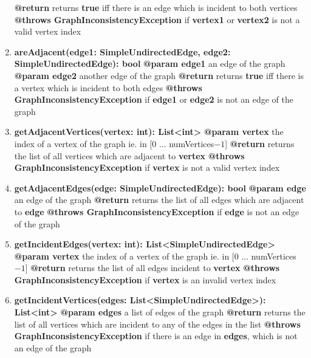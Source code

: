 \documentclass{article}
\begin{document}
\begin{enumerate}[+]
{			\textbf{@return} returns \textbf{true} iff there is an edge which is incident to both vertices \newline
			\textbf{@throws GraphInconsistencyException} if \textbf{vertex1} or \textbf{vertex2} is not a valid vertex index
		}
		\item{
			\textbf{areAdjacent(edge1: SimpleUndirectedEdge, edge2: SimpleUndirectedEdge): bool} \newline
			\textbf{@param edge1} an edge of the graph \newline
			\textbf{@param edge2} another edge of the graph \newline
			\textbf{@return} returns \textbf{true} iff there is a vertex which is incident to both edges \newline
			\textbf{@throws GraphInconsistencyException} if \textbf{edge1} or \textbf{edge2} is not an edge of the graph
		}
		\item{
			\textbf{getAdjacentVertices(vertex: int): List<int>} \newline
			\textbf{@param vertex} the index of a vertex of the graph ie. in [0 ... numVertices$-1$] \newline
			\textbf{@return} returns the list of all vertices which are adjacent to \textbf{vertex} \newline
			\textbf{@throws GraphInconsistencyException} if \textbf{vertex} is not a valid vertex index
		}
		\item{
			\textbf{getAdjacentEdges(edge: SimpleUndirectedEdge): bool} \newline
			\textbf{@param edge} an edge of the graph \newline
			\textbf{@return} returns the list of all edges which are adjacent to \textbf{edge} \newline
			\textbf{@throws GraphInconsistencyException} if \textbf{edge} is not an edge of the graph
		}
		\item{
			\textbf{getIncidentEdges(vertex: int): List<SimpleUndirectedEdge>} \newline
			\textbf{@param vertex} the index of a vertex of the graph ie. in [0 ... numVertices$-1$] \newline
			\textbf{@return} returns the list of all edges incident to \textbf{vertex} \newline
			\textbf{@throws GraphInconsistencyException} if \textbf{vertex} is an invalid vertex index
		}
		\item{
			\textbf{getIncidentVertices(edges: List<SimpleUndirectedEdge>): List<int>} \newline
			\textbf{@param edges} a list of edges of the graph \newline
			\textbf{@return} returns the list of all vertices which are incident to any of the edges in the list \newline
			\textbf{@throws GraphInconsistencyException} if there is an edge in \textbf{edges}, which is not an edge of the graph
			
}
\end{enumerate}
\end{document}
